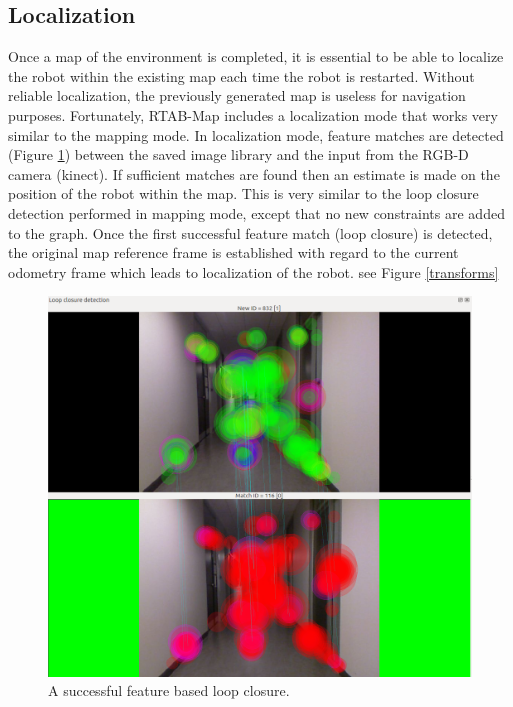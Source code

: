 \documentclass[letterpaper, 10 pt, conference]{ieeeconf}  %
\begin{document}
\subsection{Localization}

Once a map of the environment is completed, it is essential to be able to localize the robot within the existing map each time the robot is restarted. Without reliable localization, the previously generated map is useless for navigation purposes. Fortunately, RTAB-Map includes a localization mode that works very similar to the mapping mode. In localization mode, feature matches are detected (Figure \ref{localization}) between the saved image library and the input from the RGB-D camera (kinect). If sufficient matches are found then an estimate is made on the position of the robot within the map. This is very similar to the loop closure detection performed in mapping mode, except that no new constraints are added to the graph. Once the first successful feature match (loop closure) is detected, the original map reference frame is established with regard to the current odometry frame which leads to localization of the robot. see Figure \ref{transforms}

	\begin{figure}[!ht]
		\centering
		\includegraphics[width=1.0\columnwidth]{Figures/loop_closure}
		\caption{A successful feature based loop closure.}
		\label{localization}
	\end{figure}
\end{document}
